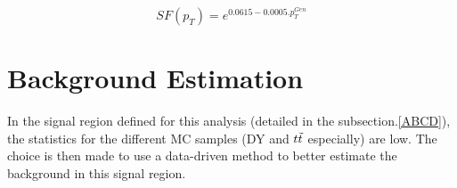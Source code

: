 \documentclass{cernatlasnote}
\begin{document}
            \begin{equation}
                SF(p_T) = e^{0.0615-0.0005.p^{Gen}_T}
            \end{equation}
\newpage
\section{Background Estimation}
\label{SEC: BKGEST}
 In the signal region defined for this analysis (detailed in the subsection.\ref{ABCD}), the statistics for the different MC samples (DY and $t\Tilde{t}$ especially) are low. The choice is then made to use a data-driven method to better estimate the background in this signal region.
\end{document}
